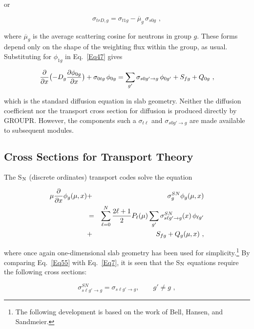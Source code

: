 \noindent
or

  \begin{equation}
    \sigma_{trD,g}=\sigma_{t1g}-\overline\mu_g\,\sigma_{s0g}\,\,,
  \end{equation}

\noindent
where $\overline\mu_g$ is the average scattering cosine for neutrons
in group $g$.  These forms depend only on the shape of the weighting
flux within the group, as usual.  Substituting for $\phi_{1g}$ in
Eq.~\ref{Eq47} gives

  \begin{equation}
    {{\partial}\over{\partial x}}\bigl(-D_g
    {{\partial\phi_{0g}}\over{\partial x}}\bigr)
    +\sigma_{0tg}\,\phi_{0g}
    =\sum_{g'}\sigma_{s0g'\rightarrow g}\,\phi_{0g'}
    +S_{fg}+Q_{0g}\,\,,
  \end{equation}

\noindent
which is the standard diffusion equation in slab geometry.  Neither the
diffusion coefficient nor the transport cross section for diffusion is
produced directly by GROUPR.  However, the components such a
$\sigma_{t\ell}$ and $\sigma_{s0g'\rightarrow g}$ are made available
to subsequent modules.

\subsection{Cross Sections for Transport Theory}
\label{ssGROUPR_Transport}

The S$_{\rm N}$ (discrete ordinates) transport codes solve the equation

  \begin{eqnarray}
    \mu{{\partial}\over{\partial x}}\phi_g(\mu,x)
    &+&\sigma_g^{SN}\phi_g(\mu,x)\nonumber\\
    &=&\sum_{\ell=0}^N{{2\ell+1}\over{2}}P_{\ell}(\mu)
    \sum_{g'}\sigma_{s\ell g'\rightarrow g}^{SN}(x)\,\phi_{\ell g'}
    \nonumber\\
    &+&S_{fg}+Q_g(\mu,x)\,\,,
  \label{Eq55}
  \end{eqnarray}

\noindent
where once again one-dimensional slab geometry has been used for
simplicity.\footnote{The following development is based on the work of
Bell, Hansen, and Sandmeier\cite{ref10}.} By comparing Eq.~\ref{Eq55}
with Eq.~\ref{Eq7}, it is seen that the S$_{\rm N}$ equations require
the following cross sections:

  \begin{equation}
    \sigma_{s\ell g'\rightarrow g}^{SN}=\sigma_{s\ell g'\rightarrow g}
    ,\qquad g'\ne g\,\,,
  \end{equation}

